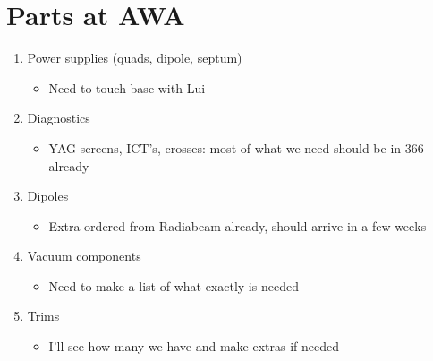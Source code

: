 \documentclass[12pt]{article}
\begin{document}
\section*{Parts at AWA}
\begin{enumerate}
	\item Power supplies (quads, dipole, septum)
	\begin{itemize}
		\item Need to touch base with Lui
	\end{itemize}
	
	\item Diagnostics
	\begin{itemize}
		\item YAG screens, ICT's, crosses: most of what we need should be in 366 already
	\end{itemize}
	
	\item Dipoles
	\begin{itemize}
		\item Extra ordered from Radiabeam already, should arrive in a few weeks
	\end{itemize}
	\item Vacuum components
	\begin{itemize}
		\item Need to make a list of what exactly is needed
	\end{itemize}
	
	\item Trims
	\begin{itemize}
		\item I'll see how many we have and make extras if needed 
	\end{itemize}
\end{enumerate}
\end{document}
